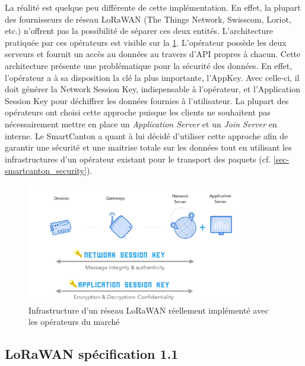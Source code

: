 La réalité est quelque peu différente de cette implémentation. En effet, la plupart des fournisseurs de réseau LoRaWAN (The Things Network, Swisscom, Loriot, etc.) n'offrent pas la possibilité de séparer ces deux entités. L'architecture pratiquée par ces opérateurs est visible sur la \cref{fig-in_practice_keys}. L'opérateur possède les deux serveurs et fournit un accès au données au travers d'API propres à chacun. Cette architecture présente une problématique pour la sécurité des données. En effet, l'opérateur a à sa disposition la clé la plus importante, l'AppKey. Avec celle-ci, il doit générer la Network Session Key, indispensable à l'opérateur, et l'Application Session Key pour déchiffrer les données fournies à l'utilisateur. 
La plupart des opérateurs ont choisi cette approche puisque les clients ne souhaitent pas nécessairement mettre en place un \textit{Application Server} et un \textit{Join Server} en interne. Le SmartCanton a quant à lui décidé d'utiliser cette approche afin de garantir une sécurité et une maitrise totale sur les données tout en utilisant les infrastructures d'un opérateur existant pour le transport des paquets (cf. \cref{sec-smartcanton_security}).


\begin{figure}[ht!]
    \centering
    \includegraphics[width=0.85\textwidth]{Figures/Security/LoRaWAN/in_practice_keys.PNG}
    \caption{Infrastructure d'un réseau LoRaWAN réellement implémenté avec les opérateurs du marché}
    \label{fig-in_practice_keys}
\end{figure}



\subsection{LoRaWAN spécification 1.1}
\label{sec-security_lorawan_1_1}

